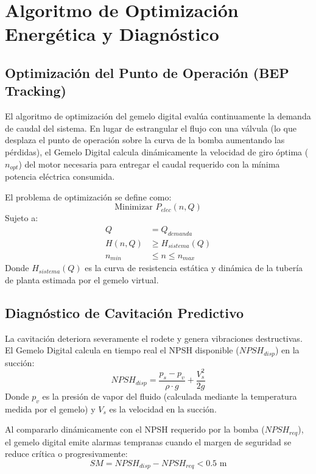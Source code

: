 \documentclass[11pt,twocolumn,a4paper]{article}
\begin{document}
\section{Algoritmo de Optimización Energética y Diagnóstico}

\subsection{Optimización del Punto de Operación (BEP Tracking)}
El algoritmo de optimización del gemelo digital evalúa continuamente la demanda de caudal del sistema. En lugar de estrangular el flujo con una válvula (lo que desplaza el punto de operación sobre la curva de la bomba aumentando las pérdidas), el Gemelo Digital calcula dinámicamente la velocidad de giro óptima ($n_{opt}$) del motor necesaria para entregar el caudal requerido con la mínima potencia eléctrica consumida.

El problema de optimización se define como:
\begin{equation}
    \text{Minimizar } P_{elec}(n, Q)
\end{equation}
Sujeto a:
\begin{align}
    Q &= Q_{demanda} \\
    H(n, Q) &\ge H_{sistema}(Q) \\
    n_{min} &\le n \le n_{max}
\end{align}
Donde $H_{sistema}(Q)$ es la curva de resistencia estática y dinámica de la tubería de planta estimada por el gemelo virtual.

\subsection{Diagnóstico de Cavitación Predictivo}
La cavitación deteriora severamente el rodete y genera vibraciones destructivas. El Gemelo Digital calcula en tiempo real el NPSH disponible ($NPSH_{disp}$) en la succión:
\begin{equation}
    NPSH_{disp} = \frac{p_s - p_v}{\rho \cdot g} + \frac{V_s^2}{2g}
\end{equation}
Donde $p_v$ es la presión de vapor del fluido (calculada mediante la temperatura medida por el gemelo) y $V_s$ es la velocidad en la succión. 

Al compararlo dinámicamente con el NPSH requerido por la bomba ($NPSH_{req}$), el gemelo digital emite alarmas tempranas cuando el margen de seguridad se reduce crítica o progresivamente:
\begin{equation}
    SM = NPSH_{disp} - NPSH_{req} < 0.5\text{ m}
\end{equation}
\end{document}
